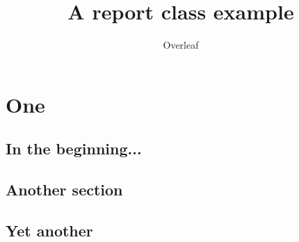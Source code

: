\documentclass{report}
\title{A report class example}
\author{Overleaf}
\begin{document}
\maketitle
\chapter{One}
\section{In the beginning...}

\section{Another section}

\section{Yet another}
\end{document}
